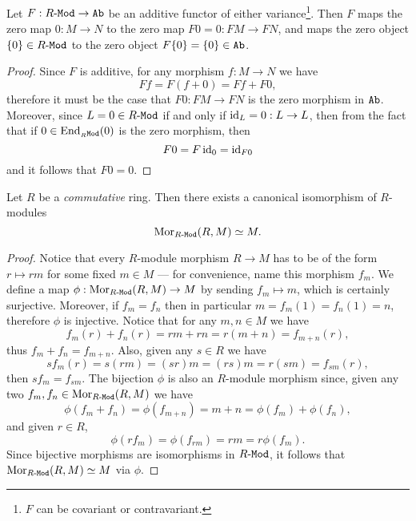 \begin{proposition}
    \label{prop:additive-functor-zero-maps-zero-obj}
    Let \(F: {R\text{-}\texttt{Mod}} \to {\texttt{Ab}}\) be an additive functor of either
    variance\footnote{\(F\) can be covariant or contravariant.}. Then
    \(F\) maps the
    zero map \(0: M \to N\) to the zero map \(F 0 = 0: F M \to F N\), and maps the zero
    object \(\{0\} \in {R\text{-}\texttt{Mod}}\) to the zero object \(F \{0\} = \{0\} \in {\texttt{Ab}}\).
\end{proposition}

\begin{proof}
    Since \(F\) is additive, for any morphism \(f: M \to N\) we have
    \[
        F f = F (f + 0) = F f + F 0,
    \]
    therefore it must be the case that \(F 0: F M \to F N\) is the zero morphism in
    \({\texttt{Ab}}\). Moreover, since \(L = 0 \in {R\text{-}\texttt{Mod}}\) if and only if \(\operatorname{id}_L = 0: L \to
    L\), then from the fact that if \(0 \in \operatorname{End}_{{{}_{R}\texttt{Mod}}}(0)\) is the zero morphism,
    then
    \[
        F 0 = F \operatorname{id}_0 = \operatorname{id}_{F 0}
    \]
    and it follows that \(F 0 = 0\).
\end{proof}

\begin{proposition}
    \label{prop:Mor(R,M)-iso-M-for-commutative-R}
    Let \(R\) be a \emph{commutative} ring. Then there exists a canonical
    isomorphism of \(R\)-modules
    \[
        \operatorname{Mor}_{{R\text{-}\texttt{Mod}}}(R, M) \simeq M.
    \]
\end{proposition}

\begin{proof}
    Notice that every \(R\)-module morphism \(R \to M\) has to be of the form
    \(r \mapsto r m\) for some fixed \(m \in M\) --- for convenience, name this
    morphism \(f_m\). We define a map \(\phi: \operatorname{Mor}_{{R\text{-}\texttt{Mod}}}(R, M) \to M\) by
    sending \(f_m \mapsto m\), which is certainly surjective. Moreover, if
    \(f_m = f_n\) then in particular \(m = f_m(1) = f_n(1) = n\), therefore \(\phi\)
    is injective. Notice that for any \(m, n \in M\) we have
    \[
        f_m(r) + f_n(r) = r m + r n = r(m + n) = f_{m + n}(r),
    \]
    thus \(f_m + f_n = f_{m + n}\). Also, given any \(s \in R\) we have
    \[
        s f_m(r) = s (r m) = (s r) m = (r s) m = r (s m) = f_{s m}(r),
    \]
    then \(s f_m = f_{s m}\).  The bijection \(\phi\) is also an \(R\)-module
    morphism since, given any two \(f_m, f_n \in \operatorname{Mor}_{{R\text{-}\texttt{Mod}}}(R, M)\) we have
    \[
        \phi(f_m + f_n) = \phi(f_{m + n}) = m + n = \phi(f_m) + \phi(f_n),
    \]
    and given \(r \in R\),
    \[
        \phi(r f_m) = \phi(f_{r m}) = r m = r \phi(f_m).
    \]
    Since bijective morphisms are isomorphisms in \({R\text{-}\texttt{Mod}}\), it follows that
    \(\operatorname{Mor}_{{R\text{-}\texttt{Mod}}}(R, M) \simeq M\) via \(\phi\).
\end{proof}

